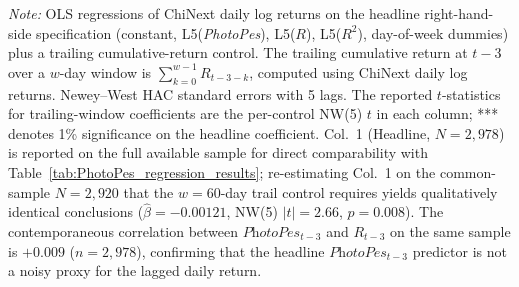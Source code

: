 \documentclass[AER]{AEA}
\begin{document}
\begin{table}[h!]
    \textit{Note:} OLS regressions of ChiNext daily log returns on the headline right-hand-side specification (constant, L5(\textit{PhotoPes}), L5($R$), L5($R^2$), day-of-week dummies) plus a trailing cumulative-return control. The trailing cumulative return at $t-3$ over a $w$-day window is $\sum_{k=0}^{w-1} R_{t-3-k}$, computed using ChiNext daily log returns. Newey--West HAC standard errors with 5 lags. The reported $t$-statistics for trailing-window coefficients are the per-control NW(5) $t$ in each column; *** denotes 1\% significance on the headline coefficient. Col.~1 (Headline, $N=2{,}978$) is reported on the full available sample for direct comparability with Table~\ref{tab:PhotoPes_regression_results}; re-estimating Col.~1 on the common-sample $N=2{,}920$ that the $w=60$-day trail control requires yields qualitatively identical conclusions ($\hat\beta=-0.00121$, NW(5) $|t|=2.66$, $p=0.008$). The contemporaneous correlation between $\textit{PhotoPes}_{t-3}$ and $R_{t-3}$ on the same sample is $+0.009$ ($n=2{,}978$), confirming that the headline $\textit{PhotoPes}_{t-3}$ predictor is not a noisy proxy for the lagged daily return.
\end{table}
\end{document}
